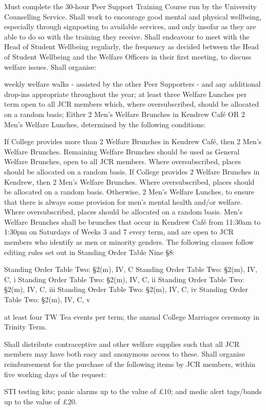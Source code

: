 Must complete the 30-hour Peer Support Training Course run by the University Counselling Service.
Shall work to encourage good mental and physical wellbeing, especially through signposting to available services, and only insofar as they are able to do so with the training they receive.
Shall endeavour to meet with the Head of Student Wellbeing regularly, the frequency as decided between the Head of Student Wellbeing and the Welfare Officers in their first meeting, to discuss welfare issues.
Shall organise:\begin{enumerate}
weekly welfare walks - assisted by the other Peer Supporters - and any additional drop-ins appropriate throughout the year;
at least three Welfare Lunches per term open to all JCR members which, where oversubscribed, should be allocated on a random basis;
Either 2 Men's Welfare Brunches in Kendrew Café OR 2 Men's Welfare Lunches, determined by the following conditions:\begin{enumerate}
If College provides more than 2 Welfare Brunches in Kendrew Café, then 2 Men's Welfare Brunches. Remaining Welfare Brunches should be used as General Welfare Brunches, open to all JCR members. Where oversubscribed, places should be allocated on a random basis.
If College provides 2 Welfare Brunches in Kendrew, then 2 Men's Welfare Brunches. Where oversubscribed, places should be allocated on a random basis.
Otherwise, 2 Men's Welfare Lunches, to ensure that there is always some provision for men's mental health and/or welfare. Where oversubscribed, places should be allocated on a random basis.
Men's Welfare Brunches shall be brunches that occur in Kendrew Café from 11:30am to 1:30pm on Saturdays of Weeks 3 and 7 every term, and are open to JCR members who identify as men or minority genders. 
The following clauses follow editing rules set out in Standing Order Table Nine §8:\begin{enumerate}
Standing Order Table Two: §2(m), IV, C
Standing Order Table Two: §2(m), IV, C, i
Standing Order Table Two: §2(m), IV, C, ii
Standing Order Table Two: §2(m), IV, C, iii
Standing Order Table Two: §2(m), IV, C, iv
Standing Order Table Two: §2(m), IV, C, v\end{enumerate}\end{enumerate}
at least four TW Tea events per term;
the annual College Marriages ceremony in Trinity Term.\end{enumerate}
Shall distribute contraceptive and other welfare supplies such that all JCR members may have both easy and anonymous access to these.
Shall organise reimbursement for the purchase of the following items by JCR members, within five working days of the request:\begin{enumerate}
STI testing kits;
panic alarms up to the value of £10; and
medic alert tags/bands up to the value of £20.\end{enumerate}
